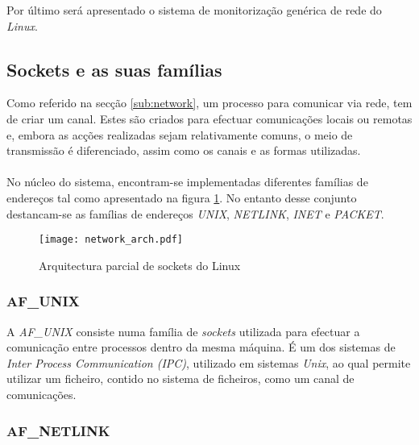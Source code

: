 Por último será apresentado o sistema de monitorização genérica de rede do \textit{Linux}.

 
\subsection{Sockets e as suas famílias}
\label{sub:sockets}

Como referido na secção \ref{sub:network}, um processo para comunicar via rede, tem de criar um canal.
Estes são criados para efectuar comunicações locais ou remotas e, embora as acções realizadas sejam relativamente comuns, o meio de transmissão é diferenciado, assim como os canais e as formas utilizadas.

\paragraph*{}

No núcleo do sistema, encontram-se implementadas diferentes famílias de endereços tal como apresentado na figura \ref{fig:network_arch}.
No entanto desse conjunto destancam-se as famílias de endereços \textit{UNIX}, \textit{NETLINK}, \textit{INET} e \textit{PACKET}.\cite{ULNI,TLNA}

\begin{figure}[!htbp]
\centering
\texttt{[image: network\_arch.pdf]} 
\caption{Arquitectura parcial de sockets do Linux}
\label{fig:network_arch}
\end{figure}

\subsubsection{AF\_UNIX}

A \textit{AF\_UNIX} consiste numa família de \textit{sockets} utilizada para efectuar a comunicação entre processos dentro da mesma máquina.
É um dos sistemas de \textit{Inter Process Communication (IPC)}, utilizado em sistemas \textit{Unix}, ao qual permite utilizar um ficheiro, contido no sistema de ficheiros, como um canal de comunicações.

\subsubsection{AF\_NETLINK}

